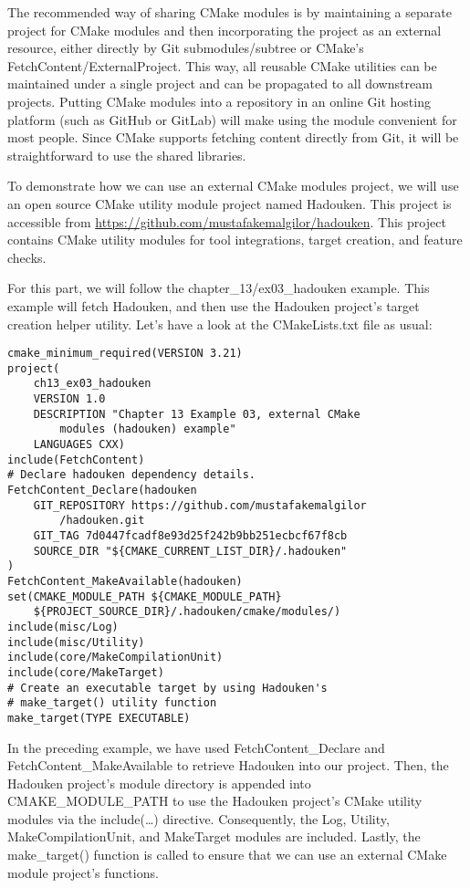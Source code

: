 The recommended way of sharing CMake modules is by maintaining a separate project for CMake modules and then incorporating the project as an external resource, either directly by Git submodules/subtree or CMake's FetchContent/ExternalProject. This way, all reusable CMake utilities can be maintained under a single project and can be propagated to all downstream projects. Putting CMake modules into a repository in an online Git hosting platform (such as GitHub or GitLab) will make using the module convenient for most people. Since CMake supports fetching content directly from Git, it will be straightforward to use the shared libraries.

To demonstrate how we can use an external CMake modules project, we will use an open source CMake utility module project named Hadouken. This project is accessible from \url{https://github.com/mustafakemalgilor/hadouken}. This project contains CMake utility modules for tool integrations, target creation, and feature checks.

For this part, we will follow the chapter\_13/ex03\_hadouken example. This example will fetch Hadouken, and then use the Hadouken project's target creation helper utility. Let's have a look at the CMakeLists.txt file as usual:

\begin{lstlisting}[style=styleCMake]
cmake_minimum_required(VERSION 3.21)
project(
	ch13_ex03_hadouken
	VERSION 1.0
	DESCRIPTION "Chapter 13 Example 03, external CMake
		modules (hadouken) example"
	LANGUAGES CXX)
include(FetchContent)
# Declare hadouken dependency details.
FetchContent_Declare(hadouken
	GIT_REPOSITORY https://github.com/mustafakemalgilor
		/hadouken.git
	GIT_TAG 7d0447fcadf8e93d25f242b9bb251ecbcf67f8cb
	SOURCE_DIR "${CMAKE_CURRENT_LIST_DIR}/.hadouken"
)
FetchContent_MakeAvailable(hadouken)
set(CMAKE_MODULE_PATH ${CMAKE_MODULE_PATH}
	${PROJECT_SOURCE_DIR}/.hadouken/cmake/modules/)
include(misc/Log)
include(misc/Utility)
include(core/MakeCompilationUnit)
include(core/MakeTarget)
# Create an executable target by using Hadouken's
# make_target() utility function
make_target(TYPE EXECUTABLE)
\end{lstlisting}

In the preceding example, we have used FetchContent\_Declare and FetchContent\_MakeAvailable to retrieve Hadouken into our project. Then, the Hadouken project's module directory is appended into CMAKE\_MODULE\_PATH to use the Hadouken project's CMake utility modules via the include(…) directive. Consequently, the Log, Utility, MakeCompilationUnit, and MakeTarget modules are included. Lastly, the make\_target() function is called to ensure that we can use an external CMake module project's functions.

